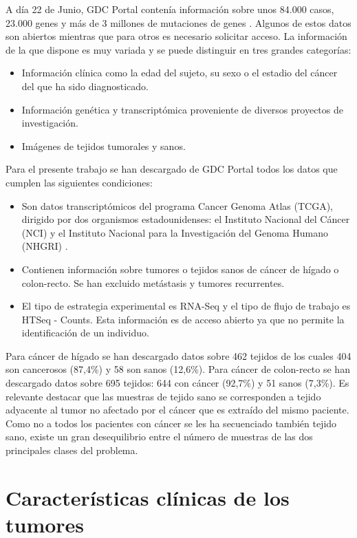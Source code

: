 A día 22 de Junio, GDC Portal contenía información sobre unos 84.000 casos, 23.000 genes y más de 3 millones de mutaciones de genes \cite{GDCPortal}. Algunos de estos datos son abiertos mientras que para otros es necesario solicitar acceso. La información de la que dispone es muy variada y se puede distinguir en tres grandes categorías:

\begin{itemize}
	\item Información clínica como la edad del sujeto, su sexo o el estadio del cáncer del que ha sido diagnosticado.
	\item Información genética y transcriptómica proveniente de diversos proyectos de investigación.
	\item Imágenes de tejidos tumorales y sanos.
\end{itemize} 

Para el presente trabajo se han descargado de GDC Portal todos los datos que cumplen las siguientes condiciones:

\begin{itemize}
	\item Son datos transcriptómicos del programa Cancer Genoma Atlas (TCGA), dirigido por dos organismos estadounidenses: el Instituto Nacional del Cáncer (NCI) y el Instituto Nacional para la Investigación del Genoma Humano (NHGRI) \cite{NationalCancerInstitutea}. 
	\item Contienen información sobre tumores o tejidos sanos de cáncer de hígado o colon-recto. Se han excluido metástasis y tumores recurrentes.
	\item El tipo de estrategia experimental es RNA-Seq y el tipo de flujo de trabajo es HTSeq - Counts. Esta información es de acceso abierto ya que no permite la identificación de un individuo.
\end{itemize}

Para cáncer de hígado se han descargado datos sobre 462 tejidos de los cuales 404 son cancerosos (87,4\%) y 58 son sanos (12,6\%).  Para cáncer de colon-recto se han descargado datos sobre 695 tejidos: 644 con cáncer (92,7\%) y 51 sanos (7,3\%). Es relevante destacar que las muestras de tejido sano se corresponden a tejido adyacente al tumor no afectado por el cáncer que es extraído del mismo paciente. Como no a todos los pacientes con cáncer se les ha secuenciado también tejido sano, existe un gran desequilibrio entre el número de muestras de las dos principales clases del problema.

\section{Características clínicas de los tumores}
 
